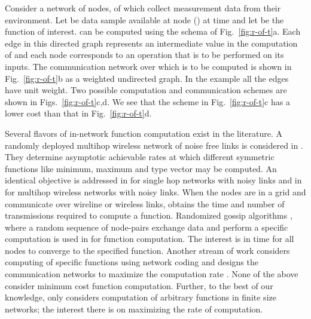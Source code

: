 \documentclass[journal]{IEEEtran}
\begin{document}
Consider a network of  nodes,  of which collect measurement data
from their environment. Let  be data sample available at node
 () at time  and let  be the function of
interest.  can be computed using the schema of
Fig.~\ref{fig:r-of-t}a. Each edge in this directed graph represents an
intermediate value in the computation of  and each node
corresponds to an operation that is to be performed on its inputs. The
communication network over which  is to be computed is shown in
Fig.~\ref{fig:r-of-t}b as a weighted undirected graph. In the example
all the edges have unit weight. Two possible computation and
communication schemes are shown in
Figs.~\ref{fig:r-of-t}c,d. We see that the scheme in
Fig.~\ref{fig:r-of-t}c has a lower cost than that in
Fig.~\ref{fig:r-of-t}d.

Several flavors of in-network function computation exist in the
literature. A randomly deployed multihop wireless network of noise
free links is considered in
\cite{Giridhar05,Giridhar06,Khude05,Kamath14}. They determine
asymptotic achievable rates at which different symmetric functions
like minimum, maximum and type vector may be computed. An identical
objective is addressed in
\cite{Gallager88,Kushilevitz98,Feige00,Newman04,Goyal05} for single
hop networks with noisy links and in \cite{Ying07,Dutta08} for
multihop wireless networks with noisy links. When the nodes are in a
 grid and communicate over wireline or
wireless links, \cite{Karamchandani11} obtains the time and number of
transmissions required to compute a function. Randomized gossip
algorithms \cite{Boyd05,Shah09}, where a random sequence of node-pairs
exchange data and perform a specific computation is used in
\cite{Mosk-Aoyama06,Ayaso08,Bodas11} for function computation. The
interest is in time for all nodes to converge to the specified
function. Another stream of work considers computing of specific
functions using network coding and designs the communication networks
to maximize the computation rate
\cite{Ramamoorthy10,Appuswamy11,Rai12}. None of the above consider
minimum cost function computation. Further, to the best of our
knowledge, only \cite{Shah13} considers computation of arbitrary
functions in finite size networks; the interest there is on maximizing
the rate of computation.
\end{document}
